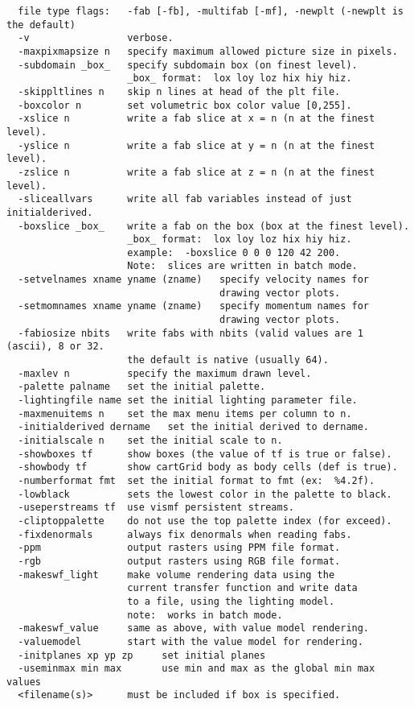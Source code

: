 \documentclass{article}
\begin{document}
\begin{verbatim}
  file type flags:   -fab [-fb], -multifab [-mf], -newplt (-newplt is the default)
  -v                 verbose.
  -maxpixmapsize n   specify maximum allowed picture size in pixels.
  -subdomain _box_   specify subdomain box (on finest level).
                     _box_ format:  lox loy loz hix hiy hiz.
  -skippltlines n    skip n lines at head of the plt file.
  -boxcolor n        set volumetric box color value [0,255].
  -xslice n          write a fab slice at x = n (n at the finest level).
  -yslice n          write a fab slice at y = n (n at the finest level).
  -zslice n          write a fab slice at z = n (n at the finest level).
  -sliceallvars      write all fab variables instead of just initialderived.
  -boxslice _box_    write a fab on the box (box at the finest level).
                     _box_ format:  lox loy loz hix hiy hiz.
                     example:  -boxslice 0 0 0 120 42 200.
                     Note:  slices are written in batch mode.
  -setvelnames xname yname (zname)   specify velocity names for
                                     drawing vector plots.
  -setmomnames xname yname (zname)   specify momentum names for
                                     drawing vector plots.
  -fabiosize nbits   write fabs with nbits (valid values are 1 (ascii), 8 or 32.
                     the default is native (usually 64).
  -maxlev n          specify the maximum drawn level.
  -palette palname   set the initial palette.
  -lightingfile name set the initial lighting parameter file.
  -maxmenuitems n    set the max menu items per column to n.
  -initialderived dername   set the initial derived to dername.
  -initialscale n    set the initial scale to n.
  -showboxes tf      show boxes (the value of tf is true or false).
  -showbody tf       show cartGrid body as body cells (def is true).
  -numberformat fmt  set the initial format to fmt (ex:  %4.2f).
  -lowblack          sets the lowest color in the palette to black.
  -useperstreams tf  use vismf persistent streams.
  -cliptoppalette    do not use the top palette index (for exceed).
  -fixdenormals      always fix denormals when reading fabs.
  -ppm               output rasters using PPM file format.
  -rgb               output rasters using RGB file format.
  -makeswf_light     make volume rendering data using the
                     current transfer function and write data
                     to a file, using the lighting model.
                     note:  works in batch mode.
  -makeswf_value     same as above, with value model rendering.
  -valuemodel        start with the value model for rendering.
  -initplanes xp yp zp     set initial planes
  -useminmax min max       use min and max as the global min max values
  <filename(s)>      must be included if box is specified.
\end{verbatim}
\end{document}
